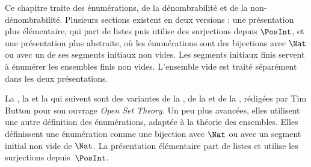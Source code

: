 \documentclass[../../../include/open-logic-chapter]{subfiles}
\begin{document}

\begin{editorial}
Ce chapitre traite des énumérations, de la dénombrabilité et de la
non-dénombrabilité. Plusieurs sections existent en deux versions :
une présentation plus élémentaire, qui part de listes puis utilise
des surjections depuis $\PosInt$, et une présentation plus abstraite,
où les énumérations sont des bijections avec
$\Nat$ ou avec un de ses segments initiaux non vides. Les segments
initiaux finis servent à énumérer les ensembles finis non vides.
L’ensemble vide est traité séparément dans les deux présentations.
%
\end{editorial}











\begin{editorial}
La , la
 et la 
qui suivent sont des variantes de la
, de la  et
de la , rédigées par Tim Button pour son
ouvrage \emph{Open Set Theory}. Un peu plus avancées, elles
utilisent une autre définition des énumérations, adaptée à la théorie
des ensembles. Elles définissent une énumération comme une bijection
avec $\Nat$ ou avec un segment initial non vide de $\Nat$. La
présentation élémentaire part de listes et utilise les surjections depuis~$\PosInt$.
\end{editorial}


\OLEndChapterHook
\end{document}
